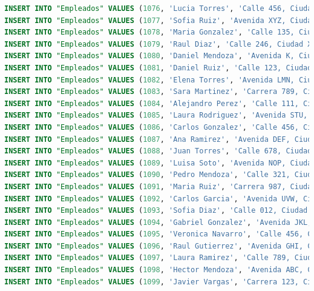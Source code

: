 \documentclass[12pt]{article}
\begin{document}
\begin{lstlisting}[language=SQL]
INSERT INTO "Empleados" VALUES (1076, 'Lucia Torres', 'Calle 456, Ciudad XYZ', '555-9012', 'Asesor');
INSERT INTO "Empleados" VALUES (1077, 'Sofia Ruiz', 'Avenida XYZ, Ciudad XYZ', '555-0123', 'Mecanico');
INSERT INTO "Empleados" VALUES (1078, 'Maria Gonzalez', 'Calle 135, Ciudad A', '555-1234', 'Promotor');
INSERT INTO "Empleados" VALUES (1079, 'Raul Diaz', 'Calle 246, Ciudad XYZ', '555-2345', 'Promotor');
INSERT INTO "Empleados" VALUES (1080, 'Daniel Mendoza', 'Avenida K, Ciudad A', '555-3456', 'Promotor');
INSERT INTO "Empleados" VALUES (1081, 'Daniel Ruiz', 'Calle 123, Ciudad XYZ', '555-4567', 'Electromecanico');
INSERT INTO "Empleados" VALUES (1082, 'Elena Torres', 'Avenida LMN, Ciudad XYZ', '555-5678', 'Gerente');
INSERT INTO "Empleados" VALUES (1083, 'Sara Martinez', 'Carrera 789, Ciudad P', '555-6789', 'Asesor');
INSERT INTO "Empleados" VALUES (1084, 'Alejandro Perez', 'Calle 111, Ciudad XYZ', '555-7890', 'Mecanico');
INSERT INTO "Empleados" VALUES (1085, 'Laura Rodriguez', 'Avenida STU, Ciudad A', '555-8901', 'Promotor');
INSERT INTO "Empleados" VALUES (1086, 'Carlos Gonzalez', 'Calle 456, Ciudad XYZ', '555-9012', 'Promotor');
INSERT INTO "Empleados" VALUES (1087, 'Ana Ramirez', 'Avenida DEF, Ciudad XYZ', '555-0123', 'Promotor');
INSERT INTO "Empleados" VALUES (1088, 'Juan Torres', 'Calle 678, Ciudad A', '555-1234', 'Electromecanico');
INSERT INTO "Empleados" VALUES (1089, 'Luisa Soto', 'Avenida NOP, Ciudad XYZ', '555-2345', 'Gerente');
INSERT INTO "Empleados" VALUES (1090, 'Pedro Mendoza', 'Calle 321, Ciudad A', '555-3456', 'Asesor');
INSERT INTO "Empleados" VALUES (1091, 'Maria Ruiz', 'Carrera 987, Ciudad XYZ', '555-4567', 'Mecanico');
INSERT INTO "Empleados" VALUES (1092, 'Carlos Garcia', 'Avenida UVW, Ciudad P', '555-5678', 'Promotor');
INSERT INTO "Empleados" VALUES (1093, 'Sofia Diaz', 'Calle 012, Ciudad XYZ', '555-6789', 'Promotor');
INSERT INTO "Empleados" VALUES (1094, 'Gabriel Gonzalez', 'Avenida JKL, Ciudad A', '555-7890', 'Promotor');
INSERT INTO "Empleados" VALUES (1095, 'Veronica Navarro', 'Calle 456, Ciudad XYZ', '555-8901', 'Electromecanico');
INSERT INTO "Empleados" VALUES (1096, 'Raul Gutierrez', 'Avenida GHI, Ciudad XYZ', '555-9012', 'Gerente');
INSERT INTO "Empleados" VALUES (1097, 'Laura Ramirez', 'Calle 789, Ciudad A', '555-0123', 'Asesor');
INSERT INTO "Empleados" VALUES (1098, 'Hector Mendoza', 'Avenida ABC, Ciudad XYZ', '555-1234', 'Mecanico');
INSERT INTO "Empleados" VALUES (1099, 'Javier Vargas', 'Carrera 123, Ciudad A', '555-2345', 'Promotor');


\end{lstlisting}
\end{document}
